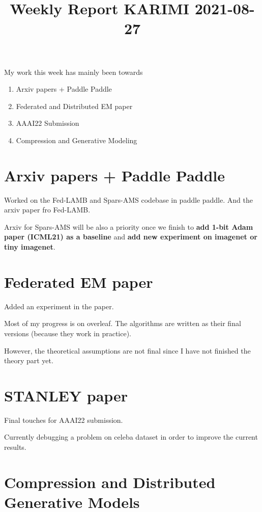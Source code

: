 \documentclass{article}
\begin{document}
\title{Weekly Report KARIMI 2021-08-27}


\date{}
\maketitle

\vspace{-0.5in}

My work this week has mainly been towards
\begin{enumerate}
\item Arxiv papers + Paddle Paddle
\item Federated and Distributed EM paper
\item AAAI22 Submission
\item Compression and Generative Modeling
\end{enumerate}



\section{Arxiv papers + Paddle Paddle}
Worked on the Fed-LAMB and Spars-AMS codebase in paddle paddle.
And the arxiv paper fro Fed-LAMB.

Arxiv for Spars-AMS will be also a priority once we finish to \textbf{add 1-bit Adam paper (ICML21) as a baseline} and \textbf{add new experiment on imagenet or tiny imagenet}.

\section{Federated EM paper}

Added an experiment in the paper.

Most of my progress is on overleaf. The algorithms are written as their final versions (because they work in practice).

However, the theoretical assumptions are not final since I have not finished the theory part yet.


\section{STANLEY paper}
Final touches for AAAI22 submission.

Currently debugging a problem on celeba dataset in order to improve the current results.


\section{Compression and Distributed Generative Models}
\end{document}
